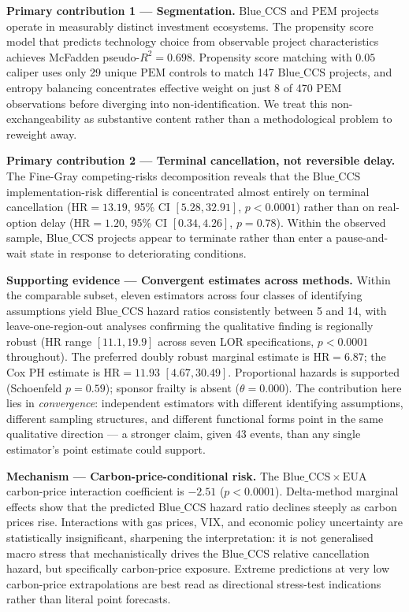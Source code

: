 \documentclass[review,authoryear,11pt]{elsarticle}
\newcommand{\HR}{\mathrm{HR}}
\newcommand{\BlueCCS}{\mathrm{Blue\_CCS}}
\newcommand{\PEM}{\mathrm{PEM}}
\newcommand{\EUA}{\mathrm{EUA}}
\begin{document}
\textbf{Primary contribution 1 --- Segmentation.} $\BlueCCS$ and $\PEM$ projects operate in measurably distinct investment ecosystems. The propensity score model that predicts technology choice from observable project characteristics achieves McFadden pseudo-$R^2 = 0.698$. Propensity score matching with $0.05$ caliper uses only 29 unique $\PEM$ controls to match 147 $\BlueCCS$ projects, and entropy balancing concentrates effective weight on just 8 of 470 $\PEM$ observations before diverging into non-identification. We treat this non-exchangeability as substantive content rather than a methodological problem to reweight away.

\textbf{Primary contribution 2 --- Terminal cancellation, not reversible delay.} The Fine-Gray competing-risks decomposition reveals that the $\BlueCCS$ implementation-risk differential is concentrated almost entirely on terminal cancellation ($\HR = 13.19$, 95\% CI $[5.28, 32.91]$, $p < 0.0001$) rather than on real-option delay ($\HR = 1.20$, 95\% CI $[0.34, 4.26]$, $p = 0.78$). Within the observed sample, $\BlueCCS$ projects appear to terminate rather than enter a pause-and-wait state in response to deteriorating conditions.

\textbf{Supporting evidence --- Convergent estimates across methods.} Within the comparable subset, eleven estimators across four classes of identifying assumptions yield $\BlueCCS$ hazard ratios consistently between 5 and 14, with leave-one-region-out analyses confirming the qualitative finding is regionally robust ($\HR$ range $[11.1, 19.9]$ across seven LOR specifications, $p < 0.0001$ throughout). The preferred doubly robust marginal estimate is $\HR = 6.87$; the Cox PH estimate is $\HR = 11.93$ $[4.67, 30.49]$. Proportional hazards is supported (Schoenfeld $p = 0.59$); sponsor frailty is absent ($\theta = 0.000$). The contribution here lies in \textit{convergence}: independent estimators with different identifying assumptions, different sampling structures, and different functional forms point in the same qualitative direction --- a stronger claim, given 43 events, than any single estimator's point estimate could support.

\textbf{Mechanism --- Carbon-price-conditional risk.} The $\BlueCCS \times \EUA$ carbon-price interaction coefficient is $-2.51$ ($p < 0.0001$). Delta-method marginal effects show that the predicted $\BlueCCS$ hazard ratio declines steeply as carbon prices rise. Interactions with gas prices, VIX, and economic policy uncertainty are statistically insignificant, sharpening the interpretation: it is not generalised macro stress that mechanistically drives the $\BlueCCS$ relative cancellation hazard, but specifically carbon-price exposure. Extreme predictions at very low carbon-price extrapolations are best read as directional stress-test indications rather than literal point forecasts.
\end{document}
